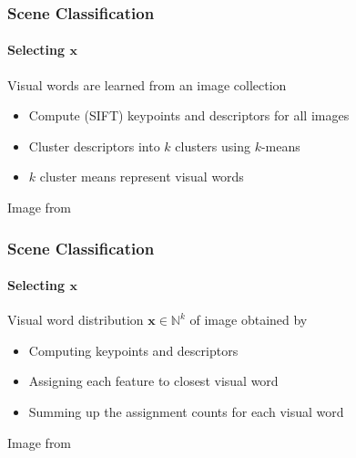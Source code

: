 \documentclass[xetex,professionalfont]{beamer}
\newcommand{\NN}{\mathbb{N}}
\renewcommand{\vec}[1]{\ensuremath{\mathbf{#1}}}
\newcommand{\vx}{\vec{x}}
\begin{document}

\begin{frame}
\frametitle{Scene Classification}
\framesubtitle{Selecting $\vx$}

Visual words are learned from an image collection
\begin{itemize}
    \item Compute (SIFT) keypoints and descriptors for all images
    \item Cluster descriptors into $k$ clusters using $k$-means %
    \item $k$ cluster means represent visual words
\end{itemize}

\medskip
\begin{center}
    {\centering Image from \cite{grauman2011}}
\end{center}

\end{frame}


\begin{frame}
\frametitle{Scene Classification}
\framesubtitle{Selecting $\vx$}

Visual word distribution $\vx\in\NN^k$ of image obtained by
\begin{itemize}
    \item Computing keypoints and descriptors
    \item Assigning each feature to closest visual word %
    \item Summing up the assignment counts for each visual word %
\end{itemize}

\medskip
\begin{center}
    {\centering Image from \cite{grauman2011}}
\end{center}

\end{frame}
\end{document}
